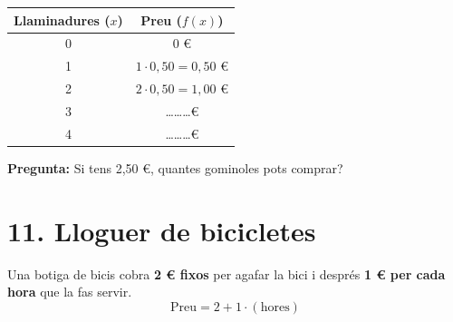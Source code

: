 \documentclass[12pt,a4paper]{article}
\begin{document}
\noindent
\begin{minipage}[t]{0.45\textwidth}
    \vspace{0pt}
    \renewcommand{\arraystretch}{1.4}
    \begin{tabular}{|c|c|}
        \hline
        \textbf{Llaminadures ($x$)} & \textbf{Preu ($f(x)$)} \\ \hline
        0 & 0 € \\ \hline
        1 & $1 \cdot 0,50 = 0,50$ € \\ \hline
        2 & $2 \cdot 0,50 = 1,00$ € \\ \hline
        3 & \dots\dots\dots € \\ \hline
        4 & \dots\dots\dots € \\ \hline
    \end{tabular}
\end{minipage}%
\hfill
\begin{minipage}[t]{0.5\textwidth}
    \vspace{0pt}
\end{minipage}

\vspace{0.2cm}
\textbf{Pregunta:} Si tens 2,50 €, quantes gominoles pots comprar? \hrulefill

\vspace{0.5cm}

\section*{11. Lloguer de bicicletes}
Una botiga de bicis cobra \textbf{2 € fixos} per agafar la bici i després \textbf{1 € per cada hora} que la fas servir.
\[ \text{Preu} = 2 + 1 \cdot (\text{hores}) \]
\end{document}
